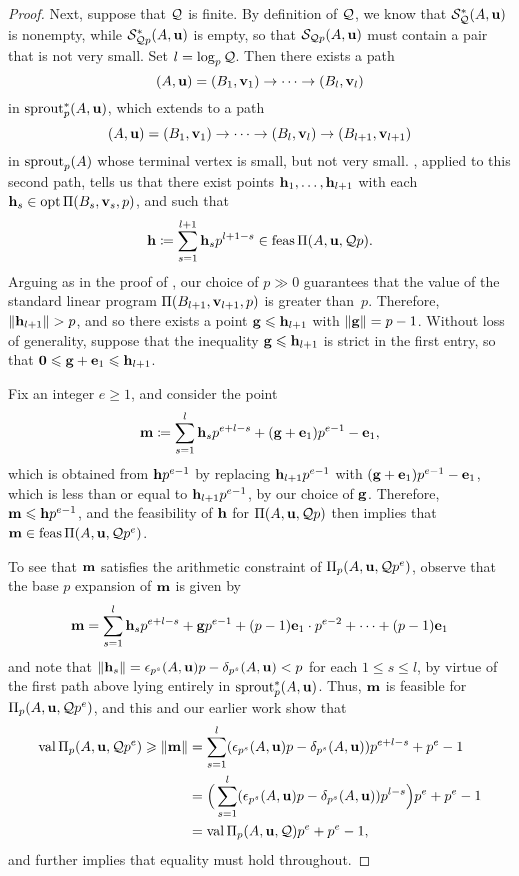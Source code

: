 \documentclass{amsart}
\begin{document}
\begin{proof}
   Next, suppose that $\mathcal{Q}$ is finite.
   By definition of $\mathcal{Q}$, we know that $\mathcal{S}_{\mathcal{Q}}^{\ast}(A,\mathbf{u})$ is nonempty, while $\mathcal{S}^{\ast}_{\mathcal{Q} p}(A,\mathbf{u})$ is empty, so that $\mathcal{S}_{\mathcal{Q} p}(A,\mathbf{u})$ must contain a pair that is not very small.
   Set $l=\log_p \mathcal{Q}$.
   Then there exists a path
   \[
      (A,\mathbf{u}) = (B_1,\mathbf{v}_1) \to \cdots \to (B_{l}, \mathbf{v}_{l})
   \]
   in $\operatorname{sprout}_p^{\ast}(A,\mathbf{u})$, which extends to a path
   \[
      (A,\mathbf{u}) = (B_1,\mathbf{v}_1) \to \cdots \to (B_{l}, \mathbf{v}_{l}) \to (B_{l+1}, \mathbf{v}_{l+1})
   \]
   in $\operatorname{sprout}_p(A)$ whose terminal vertex is small, but not very small.
   , applied to this second path, tells us that there exist points $\mathbf{h}_1,\ldots, \mathbf{h}_{l+1}$ with each $\mathbf{h}_s \in \operatorname{opt} \Pi(B_s, \mathbf{v}_s, p)$, and such that
   \[
      \mathbf{h} \coloneqq \sum_{s=1}^{l+1} \mathbf{h}_s p^{l+1-s} \in \operatorname{feas} \Pi(A,\mathbf{u}, \mathcal{Q} p).
   \]
   Arguing as in the proof of , our choice of $p \gg 0$ guarantees that the value of the standard linear program $\Pi(B_{l+1}, \mathbf{v}_{l+1},p)$ is greater than~$p$.
   Therefore, $\| \mathbf{h}_{l+1} \| > p$, and so there exists a point $\mathbf{g} \leqslant \mathbf{h}_{l+1}$ with $\| \mathbf{g} \| = p-1$.
   Without loss of generality, suppose that the inequality $\mathbf{g} \leqslant \mathbf{h}_{l+1}$ is strict in the first entry, so that $\mathbf{0} \leqslant \mathbf{g} + \mathbf{e}_1 \leqslant \mathbf{h}_{l+1}$.

   Fix an integer $e \geq 1$, and consider the point
   \[
      \mathbf{m} \coloneqq \sum_{s=1}^{l} \mathbf{h}_s p^{e+l-s} + (\mathbf{g}+\mathbf{e}_1)p^{e-1} - \mathbf{e}_1,
   \]
   which is obtained from $\mathbf{h}p^{e-1}$ by replacing $\mathbf{h}_{l+1}p^{e-1}$ with  $(\mathbf{g}+\mathbf{e}_1)p^{e-1} - \mathbf{e}_1$, which is less than or equal to $\mathbf{h}_{l+1} p^{e-1}$, by our choice of $\mathbf{g}$.
   Therefore, $\mathbf{m} \leqslant \mathbf{h}p^{e-1}$, and the feasibility of $\mathbf{h}$ for $\Pi(A,\mathbf{u}, \mathcal{Q} p)$ then implies that $\mathbf{m} \in \operatorname{feas} \Pi(A,\mathbf{u}, \mathcal{Q} p^e)$.

   To see that $\mathbf{m}$ satisfies the arithmetic constraint of $\Pi_p(A,\mathbf{u}, \mathcal{Q} p^e)$, observe that the base $p$ expansion of $\mathbf{m}$ is given by
   \[
      \mathbf{m} = \sum_{s=1}^{l} \mathbf{h}_s p^{e+l-s} + \mathbf{g}p^{e-1} + (p-1) \mathbf{e}_1 \cdot p^{e-2} + \cdots + (p-1)\mathbf{e}_1
   \]
   and note that $\| \mathbf{h}_s \| = \epsilon_{p^s}(A,\mathbf{u})p-\delta_{p^s}(A,\mathbf{u}) < p$ for each $1 \leq s \leq l$, by virtue of the first path above lying entirely in $\operatorname{sprout}_p^{\ast}(A,\mathbf{u})$.
   Thus, $\mathbf{m}$ is feasible for $\Pi_p(A,\mathbf{u}, \mathcal{Q} p^e)$, and this and our earlier work show that
   \begin{align*}
     \operatorname{val} \Pi_p(A,\mathbf{u}, \mathcal{Q} p^e) \geqslant \| \mathbf{m} \| & = \sum_{s=1}^l (\epsilon_{p^s}(A,\mathbf{u})p-\delta_{p^s}(A,\mathbf{u})) p^{e+l-s} + p^e-1 \\
                                                     & = \Big ( \sum_{s=1}^l (\epsilon_{p^s}(A,\mathbf{u})p-\delta_{p^s}(A,\mathbf{u})) p^{l-s} \Big ) p^e + p^e-1 \\
                                                     & = \operatorname{val} \Pi_p(A,\mathbf{u}, \mathcal{Q}) p^e + p^e-1,
   \end{align*}
   and  further implies that equality must hold throughout.


\end{proof}
\end{document}
